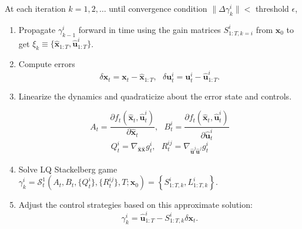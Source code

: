 \documentclass[11pt]{article}
\newcommand\dd[2]{\frac{\partial#1}{\partial#2}}
\newcommand\truestate[1]{\bm{x}_{#1}}
\newcommand\stack[2]{\mathcal{S}^{#1}_{#2}}
\newcommand\ctrl[2]{\bm{u}^{#1}_{#2}}
\newcommand\horizon{T}
\newcommand\stackmeas[2]{\bm{\hat{x}}^{#1}_{#2}}
\newcommand\ctrlhat[2]{\bm{\hat{u}}^{#1}_{#2}}
\begin{document}
At each iteration $k = 1, 2, \ldots$ until convergence condition $\| \Delta \gamma^i_{k} \| < $ threshold $\epsilon$,
\begin{enumerate}
\item Propagate $\gamma^i_{k-1}$ forward in time using the gain matrices $S^i_{1:T, k=i}$ from $\truestate{0}$ to get $\xi_k \equiv \{ \stackmeas{}{1:\horizon}, \ctrlhat{i}{1:\horizon} \}$.

\item Compute errors
\[ \delta \truestate{t} = \truestate{t} - \stackmeas{}{1:\horizon}, ~~~ \delta \ctrl{i}{t} = \ctrl{i}{t} -  \ctrlhat{i}{1:\horizon}. \]

\item Linearize the dynamics and quadraticize about the error state and controls.

\[ A_t = \dd{f_t(\stackmeas{}{t}, \ctrlhat{i}{t})}{\stackmeas{}{t}}, ~~~ B^i_t = \dd{f_t(\stackmeas{}{t}, \ctrlhat{i}{t})}{\ctrlhat{i}{t}} \]
\[ Q^i_t = \nabla_{\stackmeas{}{}\stackmeas{}{}} g^i_t, ~~~ R^{ij}_t = \nabla_{\ctrlhat{j}{}\ctrlhat{j}{}} g^i_t \]

\item Solve LQ Stackelberg game $\gamma^i_{k} = \stack{1}{t}(A_t, B_t, \{ Q^i_t \}, \{ R^{ij}_t \}, \horizon; \truestate{0}) = \left\{ S^i_{1:T, k}, L^i_{1:T, k} \right\}$.

\item Adjust the control strategies based on this approximate solution:
\[ \gamma^i_k = \ctrlhat{i}{1:T} - S^i_{1:T, k} \delta\truestate{t}.  \]
\end{enumerate}
\end{document}
